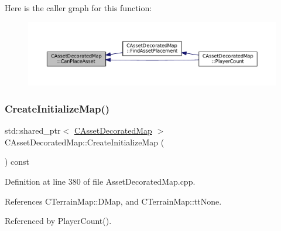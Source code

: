 Here is the caller graph for this function\+:\nopagebreak
\begin{figure}[H]
\begin{center}
\leavevmode
\includegraphics[width=350pt]{classCAssetDecoratedMap_ad4baef4b84b066847459e45205c8575c_icgraph}
\end{center}
\end{figure}
\hypertarget{classCAssetDecoratedMap_a2807be3f5fe7858f476b80fef228fa03}{}\label{classCAssetDecoratedMap_a2807be3f5fe7858f476b80fef228fa03} 
\subsubsection{\texorpdfstring{Create\+Initialize\+Map()}{CreateInitializeMap()}}
{\footnotesize\ttfamily std\+::shared\+\_\+ptr$<$ \hyperlink{classCAssetDecoratedMap}{C\+Asset\+Decorated\+Map} $>$ C\+Asset\+Decorated\+Map\+::\+Create\+Initialize\+Map (\begin{DoxyParamCaption}{ }\end{DoxyParamCaption}) const}



Definition at line 380 of file Asset\+Decorated\+Map.\+cpp.



References C\+Terrain\+Map\+::\+D\+Map, and C\+Terrain\+Map\+::tt\+None.



Referenced by Player\+Count().



